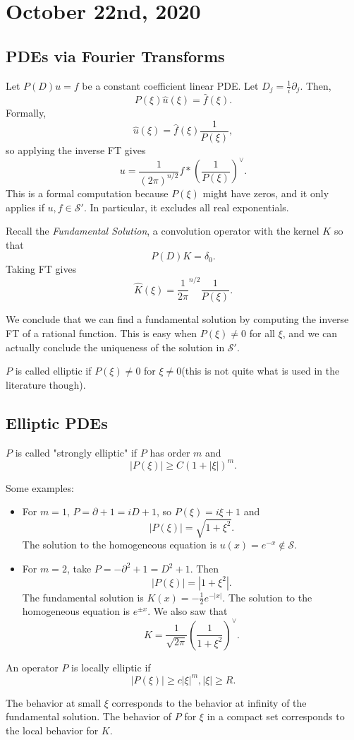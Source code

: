 \documentclass[12pt]{scrartcl}
\renewcommand{\hat}{\widehat}
\begin{document}
\section{October 22nd, 2020}
\subsection{PDEs via Fourier Transforms}
Let $P(D)u = f$ be a constant coefficient linear PDE.  Let $D_j = \frac{1}{i} \partial_j$.  Then,
$$P(\xi)\hat{u}(\xi) = \hat{f}(\xi).$$
Formally, 
$$\hat{u}(\xi) = \hat{f}(\xi) \frac{1}{P(\xi)},$$
so applying the inverse FT gives 
$$u = \frac{1}{(2\pi)^{n/2}}f *\left(\frac{1}{P(\xi)}\right)^\vee.$$
This is a formal computation because $P(\xi)$ might have zeros, and it only applies if $u, f \in \mathcal S'$.  In particular, it excludes all real exponentials.

Recall the \textit{Fundamental Solution}, a convolution operator with the kernel $K$ so that 
$$P(D)K = \delta_0.$$
Taking FT gives
$$\hat{K}(\xi) = \frac{1}{2\pi}^{n/2}\frac{1}{P(\xi)}.$$

We conclude that we can find a fundamental solution by computing the inverse FT of a rational function.  This is easy when $P(\xi) \ne 0$ for all $\xi$, and we can actually conclude the uniqueness of the solution in $\mathcal S'$.  
\begin{definition} $P$ is called elliptic if $P(\xi) \ne 0$  for $\xi \ne 0$(this is not quite what is used in the literature though).
\end{definition}
\subsection{Elliptic PDEs}
\begin{definition} $P$ is called "strongly elliptic" if $P$ has order $m$ and 
$$|P(\xi)| \ge C(1 + |\xi|)^m.$$
\end{definition}
Some examples:
\begin{itemize}
\item For $m = 1$, $P = \partial + 1 = iD + 1$, so $P(\xi) = i\xi + 1$ and 
$$|P(\xi)| = \sqrt{1 + \xi^2}.$$  
The solution to the homogeneous equation is $u(x) = e^{-x} \not \in \mathcal S$.
\item For $m = 2$, take $P = -\partial^2 + 1 = D^2 + 1$.  Then
$$|P(\xi)| = |1 + \xi^2|.$$
The fundamental solution is $K(x) = -\frac{1}{2}e^{-|x|}$.  The solution to the homogeneous equation is $e^{\pm x}$.   We also saw that 
$$K = \frac{1}{\sqrt{2\pi}}\left (\frac{1}{1+\xi^2}\right )^\vee.$$
\end{itemize}
\begin{definition} An operator $P$ is locally elliptic if 
$$|P(\xi)| \ge c|\xi|^m, |\xi| \ge R.$$
\end{definition}
The behavior at small $\xi$ corresponds to the behavior at infinity of the fundamental solution.  The behavior of $P$ for $\xi$ in a compact set corresponds to the local behavior for $K$.
\end{document}
